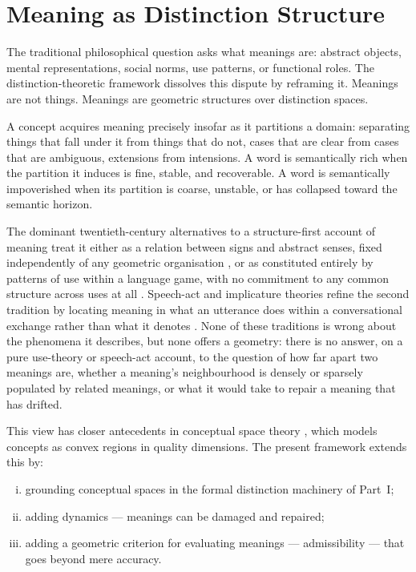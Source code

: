 \documentclass[12pt,twoside,openright]{book}
\begin{document}
\section{Meaning as Distinction Structure}

The traditional philosophical question asks what meanings
are: abstract objects, mental representations, social
norms, use patterns, or functional roles.
The distinction-theoretic framework dissolves this
dispute by reframing it.
Meanings are not things. Meanings are geometric
structures over distinction spaces.

A concept acquires meaning precisely insofar as it
partitions a domain: separating things that fall under
it from things that do not, cases that are clear from
cases that are ambiguous, extensions from intensions.
A word is semantically rich when the partition it
induces is fine, stable, and recoverable.
A word is semantically impoverished when its partition
is coarse, unstable, or has collapsed toward the
semantic horizon.

The dominant twentieth-century alternatives to a
structure-first account of meaning treat it either as a
relation between signs and abstract senses, fixed
independently of any geometric organisation
\parencite{frege1892}, or as constituted entirely by patterns
of use within a language game, with no commitment to any
common structure across uses at all \parencite{wittgenstein1953}.
Speech-act and implicature theories refine the second
tradition by locating meaning in what an utterance does
within a conversational exchange rather than what it denotes
\parencite{austin1962,grice1975}. None of these traditions is
wrong about the phenomena it describes, but none offers a
geometry: there is no answer, on a pure use-theory or
speech-act account, to the question of how far apart two
meanings are, whether a meaning's neighbourhood is densely or
sparsely populated by related meanings, or what it would take
to repair a meaning that has drifted.

This view has closer antecedents in conceptual space theory
\parencite{gardenfors2000conceptual}, which models
concepts as convex regions in quality dimensions.
The present framework extends this by:
\begin{enumerate}[(i)]
  \item grounding conceptual spaces in the formal
        distinction machinery of Part~I;
  \item adding dynamics — meanings can be damaged and
        repaired;
  \item adding a geometric criterion for evaluating
        meanings — admissibility — that goes beyond
        mere accuracy.
\end{enumerate}
\end{document}
